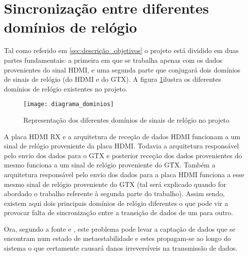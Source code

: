 
\section{Sincronização entre diferentes domínios de relógio} \label{sec:sincronizacao}

Tal como referido em \ref{sec:descrição_objetivos} o projeto está dividido em duas partes fundamentais: a primeira em que se trabalha apenas com os dados provenientes do sinal HDMI, e uma segunda parte que conjugará dois domínios de sinais de relógio (do HDMI e do GTX). A figura \ref{fig:dominios_diferentes}ilustra os diferentes domínios de relógio existentes no projeto.

\begin{figure}[h!]
	\begin{center}
		\leavevmode
		\texttt{[image: diagrama\_dominios]}
		\caption{Representação dos diferentes domínios de sinais de relógio no projeto}
		\label{fig:dominios_diferentes}
	\end{center}
\end{figure}

A placa HDMI RX e a arquitetura de receção de dados HDMI funcionam a um sinal de relógio proveniente da placa HDMI. Todavia a arquitetura responsável pelo envio dos dados para o GTX e posterior receção dos dados provenientes do mesmo funciona a um sinal de relógio proveniente do GTX. Também a arquitetura responsável pelo envio dos dados para a placa HDMI funciona a esse mesmo sinal de relógio proveniente do GTX (tal será explicado quando for abordado o trabalho referente à segunda parte do trabalho). Assim sendo, existem aqui dois principais domínios de relógio diferentes o que pode vir a provocar falta de sincronização entre a transição de dados de um para outro.


Ora, segundo a fonte \cite{R024} e \cite{R037}, este problema pode levar a captação de dados que se encontram num estado de metaestabilidade e estes propagam-se ao longo do sistema o que certamente causará danos irreversíveis na transmissão de dados. 

